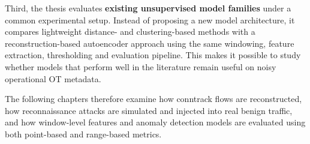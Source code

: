 Third, the thesis evaluates \textbf{existing unsupervised model families} under a common experimental setup. Instead of proposing a new model architecture, it compares lightweight distance- and clustering-based methods with a reconstruction-based autoencoder approach using the same windowing, feature extraction, thresholding and evaluation pipeline. This makes it possible to study whether models that perform well in the literature remain useful on noisy operational OT metadata.


The following chapters therefore examine how conntrack flows are reconstructed, how reconnaissance attacks are simulated and injected into real benign traffic, and how window-level features and anomaly detection models are evaluated using both point-based and range-based metrics.


